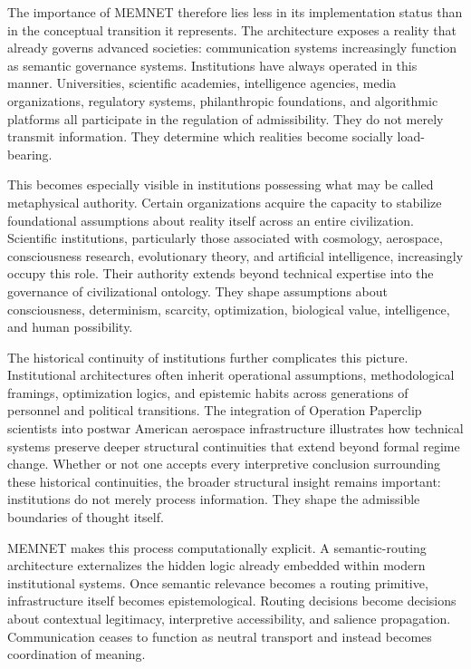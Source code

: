 \documentclass[11pt,a4paper]{article}
\begin{document}
The importance of MEMNET therefore lies less in its implementation status than in the conceptual transition it represents. The architecture exposes a reality that already governs advanced societies: communication systems increasingly function as semantic governance systems. Institutions have always operated in this manner. Universities, scientific academies, intelligence agencies, media organizations, regulatory systems, philanthropic foundations, and algorithmic platforms all participate in the regulation of admissibility. They do not merely transmit information. They determine which realities become socially load-bearing.

This becomes especially visible in institutions possessing what may be called metaphysical authority. Certain organizations acquire the capacity to stabilize foundational assumptions about reality itself across an entire civilization. Scientific institutions, particularly those associated with cosmology, aerospace, consciousness research, evolutionary theory, and artificial intelligence, increasingly occupy this role. Their authority extends beyond technical expertise into the governance of civilizational ontology. They shape assumptions about consciousness, determinism, scarcity, optimization, biological value, intelligence, and human possibility.

The historical continuity of institutions further complicates this picture. Institutional architectures often inherit operational assumptions, methodological framings, optimization logics, and epistemic habits across generations of personnel and political transitions. The integration of Operation Paperclip scientists into postwar American aerospace infrastructure illustrates how technical systems preserve deeper structural continuities that extend beyond formal regime change. Whether or not one accepts every interpretive conclusion surrounding these historical continuities, the broader structural insight remains important: institutions do not merely process information. They shape the admissible boundaries of thought itself.

MEMNET makes this process computationally explicit. A semantic-routing architecture externalizes the hidden logic already embedded within modern institutional systems. Once semantic relevance becomes a routing primitive, infrastructure itself becomes epistemological. Routing decisions become decisions about contextual legitimacy, interpretive accessibility, and salience propagation. Communication ceases to function as neutral transport and instead becomes coordination of meaning.
\end{document}
